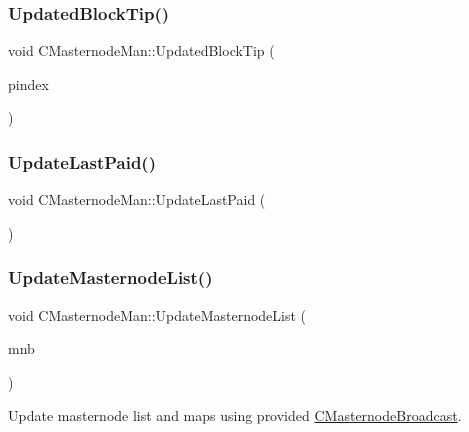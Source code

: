 \subsubsection{\texorpdfstring{Updated\+Block\+Tip()}{UpdatedBlockTip()}}
{\footnotesize\ttfamily void C\+Masternode\+Man\+::\+Updated\+Block\+Tip (\begin{DoxyParamCaption}\item[{const \mbox{\hyperlink{class_c_block_index}{C\+Block\+Index}} $\ast$}]{pindex }\end{DoxyParamCaption})}

\mbox{\label{class_c_masternode_man_acc3eced357099a5ed8d2585a9f0b3e67}} 
\subsubsection{\texorpdfstring{Update\+Last\+Paid()}{UpdateLastPaid()}}
{\footnotesize\ttfamily void C\+Masternode\+Man\+::\+Update\+Last\+Paid (\begin{DoxyParamCaption}{ }\end{DoxyParamCaption})}

\mbox{\label{class_c_masternode_man_aed8b4c3eec39239a4c63c2cda5e7588c}} 
\subsubsection{\texorpdfstring{Update\+Masternode\+List()}{UpdateMasternodeList()}}
{\footnotesize\ttfamily void C\+Masternode\+Man\+::\+Update\+Masternode\+List (\begin{DoxyParamCaption}\item[{\mbox{\hyperlink{class_c_masternode_broadcast}{C\+Masternode\+Broadcast}}}]{mnb }\end{DoxyParamCaption})}



Update masternode list and maps using provided \mbox{\hyperlink{class_c_masternode_broadcast}{C\+Masternode\+Broadcast}}. 

\mbox{\label{class_c_masternode_man_a7bdb7da4bf4b3580f90436e61d3f677d}} 
